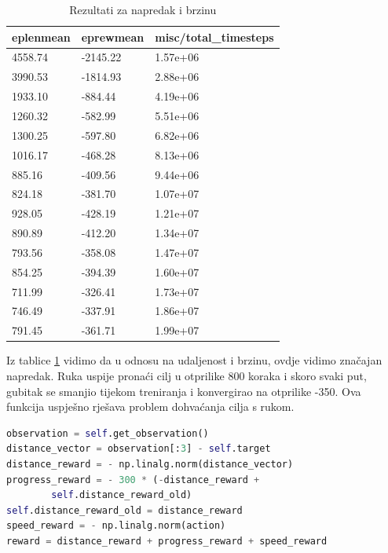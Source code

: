 \documentclass[times,utf8,diplomski]{fer}
\begin{document}
\begin{table}[ht!]
\centering
\caption{Rezultati za napredak i brzinu}
\label{tab:rnb}
\begin{tabular}{@{}lll@{}}
\hline
eplenmean & eprewmean & misc/total\_timesteps \\
\hline
\hline
4558.74 & -2145.22 & 1.57e+06 \\ 
3990.53 & -1814.93 & 2.88e+06 \\ 
1933.10 & -884.44 & 4.19e+06 \\ 
1260.32 & -582.99 & 5.51e+06 \\ 
1300.25 & -597.80 & 6.82e+06 \\ 
1016.17 & -468.28 & 8.13e+06 \\ 
885.16 & -409.56 & 9.44e+06 \\ 
824.18 & -381.70 & 1.07e+07 \\ 
928.05 & -428.19 & 1.21e+07 \\ 
890.89 & -412.20 & 1.34e+07 \\ 
793.56 & -358.08 & 1.47e+07 \\ 
854.25 & -394.39 & 1.60e+07 \\ 
711.99 & -326.41 & 1.73e+07 \\ 
746.49 & -337.91 & 1.86e+07 \\ 
791.45 & -361.71 & 1.99e+07 \\ 
\hline
\end{tabular}
\end{table}

Iz tablice \ref{tab:rnb} vidimo da u odnosu na udaljenost i brzinu, ovdje vidimo značajan napredak. Ruka uspije pronaći cilj u otprilike 800 koraka i skoro svaki put, gubitak se smanjio tijekom treniranja i konvergirao na otprilike -350. Ova funkcija uspješno rješava problem dohvaćanja cilja s rukom.

\begin{lstlisting}[caption={Kod za udaljenost, napredak i brzina},language=Python]
observation = self.get_observation()
distance_vector = observation[:3] - self.target
distance_reward = - np.linalg.norm(distance_vector)
progress_reward = - 300 * (-distance_reward +
		self.distance_reward_old)
self.distance_reward_old = distance_reward
speed_reward = - np.linalg.norm(action)
reward = distance_reward + progress_reward + speed_reward
\end{lstlisting}
\end{document}

